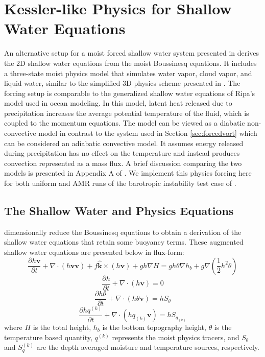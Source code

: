 \section{Kessler-like Physics for Shallow Water Equations}
\label{sec:kesslersw}
An alternative setup for a moist forced shallow water system presented in 
\cite{zerroukat2015moist} derives the 2D shallow water equations from 
the moist Boussinesq equations. It includes a three-state moist physics 
model that simulates water vapor, cloud vapor, and liquid water, 
similar to the simplified 3D physics scheme presented in 
\cite{kessler1969distribution}. The forcing setup
is comparable to the generalized shallow water equations of Ripa's 
model \citep{ripa1993conservation,ripa1995improving} 
used in ocean modeling.  
In this model, latent heat released due to precipitation increases 
the average potential temperature of the fluid, which is coupled
to the momentum equations. The model can be viewed as a
diabatic non-convective model in contrast to the system used in Section \ref{sec:forcedvort} 
which can be considered an adiabatic convective 
model. It assumes energy released during
precipitation has no effect on the temperature and instead 
produces convection represented as a mass flux. A
brief discussion comparing the two models
is presented in Appendix A of \cite{bouchut2009fronts}.
We implement this physics forcing here for both uniform and
AMR runs of the barotropic instability test case of
\cite{galewsky2004initial}.

\subsection{The Shallow Water and Physics Equations}
\cite{zerroukat2015moist} dimensionally reduce the Boussinesq equations 
to obtain a derivation of the shallow water equations that retain some
buoyancy terms. These augmented shallow water equations are presented below in flux-form:
   \begin{equation}
     \label{eq:swkesmom} \frac{\partial h \mathbf{v}}{\partial t} +
     \nabla \cdot (h \mathbf{v} \mathbf{v}) + f \mathbf{\hat{k}}\times(h\mathbf{v}) + gh\nabla H = 
     g h \theta \nabla h_b + g\nabla (\frac{1}{2}h^2\theta)
   \end{equation}
   \begin{equation}
     \label{eq:swkescon}  \frac{\partial h}{\partial t} + \nabla \cdot (h\mathbf{v}) = 0
   \end{equation}
   \begin{equation}
     \label{eq:swthetacon}  \frac{\partial h\theta}{\partial t} + \nabla \cdot (h \theta \mathbf{v}) = hS_\theta
   \end{equation}
   \begin{equation}
     \label{eq:swkesqcon}  \frac{\partial h q^{(k)}}{\partial t} + \nabla \cdot (h  q_{(k)} \mathbf{v}) = hS_{q_{(k)}}
   \end{equation}
where $H$ is the total height, $h_b$ is the bottom topography height, $\theta$ is the temperature based 
quantity, $q^{(k)}$ represents the moist physics tracers, and $S_\theta$ and $S_q^{(k)}$ are 
the depth averaged moisture and temperature sources, respectively. 
    
